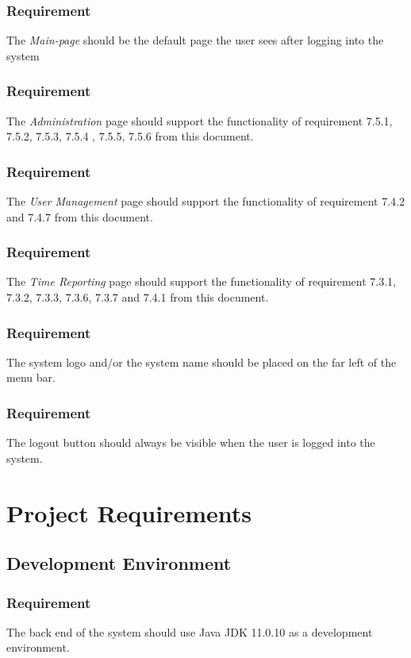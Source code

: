 \documentclass{article}
\begin{document}
\subsubsection{Requirement}
The \textit{Main-page} should be the default page the user sees after logging into the system

\subsubsection{Requirement}
The \textit{Administration} page should support the functionality of requirement 7.5.1, 7.5.2, 7.5.3, 7.5.4 , 7.5.5, 7.5.6 from this document.

\subsubsection{Requirement}
The \textit{User Management} page should support the functionality of requirement 7.4.2 and 7.4.7 from this document.

\subsubsection{Requirement}
The \textit{Time Reporting} page should support the functionality of requirement 7.3.1, 7.3.2, 7.3.3, 7.3.6, 7.3.7 and 7.4.1 from this document.

\subsubsection{Requirement}
The system logo and/or the system name should be placed on the far left
of the menu bar.

\subsubsection{Requirement}
The logout button should always be visible when the user is logged into the system. 

\section{Project Requirements}
\subsection{Development Environment}

\subsubsection{Requirement}
The back end of the system should use Java JDK 11.0.10 as a development environment.
\end{document}
